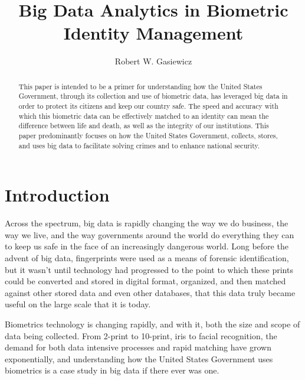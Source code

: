 \documentclass[sigconf]{acmart}
\begin{document}
\title{Big Data Analytics in Biometric Identity Management}


\author{Robert W. Gasiewicz}

\begin{abstract}
This paper is intended to be a primer for understanding how the United States Government, through its collection and use of biometric data, has leveraged big data in order to protect its citizens and keep our country safe. The speed and accuracy with which this biometric data can be effectively matched to an identity can mean the difference between life and death, as well as the integrity of our institutions. This paper predominantly focuses on how the United States Government, collects, stores, and uses big data to facilitate solving crimes and to enhance national security. 
\end{abstract}



\maketitle

\section{Introduction}

Across the spectrum, big data is rapidly changing the way we do business, the way we live, and the way governments around the world do everything they can to keep us safe in the face of an increasingly dangerous world. Long before the advent of big data, fingerprints were used as a means of forensic identification, but it wasn't until technology had progressed to the point to which these prints could be converted and stored in digital format, organized, and then matched against other stored data and even other databases, that this data truly became useful on the large scale that it is today. 

Biometrics technology is changing rapidly, and with it, both the size and scope of data being collected. From 2-print to 10-print, iris to facial recognition, the demand for both data intensive processes and rapid matching have grown exponentially, and understanding how the United States Government uses biometrics is a case study in big data if there ever was one. 
\end{document}
